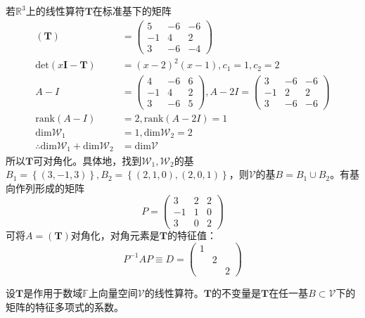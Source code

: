 \documentclass[main.tex]{subfiles}
\begin{document}
\begin{example}
若$\mathbb{R}^3$上的线性算符$\mathbf{T}$在标准基下的矩阵
\begin{align*}
\left(\mathbf{T}\right)&=\left(\begin{array}{ccc}5&-6&-6\\-1&4&2\\3&-6&-4\end{array}\right)\\
\mathrm{det}\left(x\mathbf{I}-\mathbf{T}\right)&=\left(x-2\right)^2\left(x-1\right),c_1=1,c_2=2\\
A-I&=\left(\begin{array}{ccc}4&-6&6\\-1&4&2\\3&-6&5\end{array}\right),A-2I=\left(\begin{array}{ccc}3&-6&-6\\-1&2&2\\3&-6&-6\end{array}\right)\\
\mathrm{rank}\left(A-I\right)&=2,\mathrm{rank}\left(A-2I\right)=1\\
\mathrm{dim}\mathcal{W}_1&=1,\mathrm{dim}\mathcal{W}_2=2\\
\therefore \mathrm{dim}\mathcal{W}_1+\mathrm{dim}\mathcal{W}_2&=\mathrm{dim}\mathcal{V}
\end{align*}
所以$\mathbf{T}$可对角化。具体地，找到$\mathcal{W}_1,\mathcal{W}_2$的基$B_1=\left\{\left(3,-1,3\right)\right\},B_2=\left\{\left(2,1,0\right),\left(2,0,1\right)\right\}$，则$\mathcal{V}$的基$B=B_1\cup B_2$。有基向作列形成的矩阵
\[
P=\left(\begin{array}{ccc}
3&2&2\\-1&1&0\\3&0&2\end{array}\right)
\]
可将$A=\left(\mathbf{T}\right)$对角化，对角元素是$\mathbf{T}$的特征值：
\[P^{-1}AP\equiv D=\left(\begin{array}{ccc}1&&\\&2&\\&&2\end{array}\right)\]
\end{example}

\begin{definition}[线性算符的不变量]
设$\mathbf{T}$是作用于数域$\mathbb{F}$上向量空间$\mathcal{V}$的线性算符。$\mathbf{T}$的不变量是$\mathbf{T}$在任一基$B\subset\mathcal{V}$下的矩阵的特征多项式的系数。
\end{definition}
\end{document}
